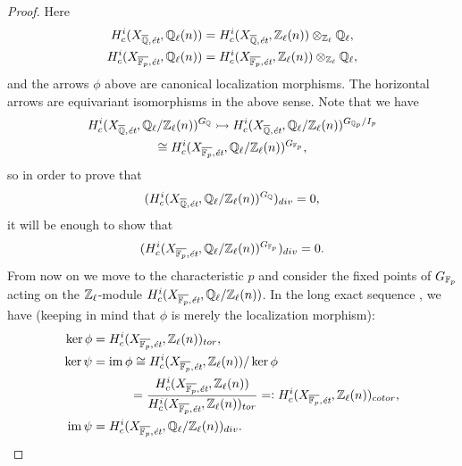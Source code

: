 \begin{proposition}
\begin{proof}
    Here
    \begin{align*}
      H_c^i (X_{\overline{\mathbb{Q}},\text{\it ét}}, \mathbb{Q}_\ell (n)) & = H_c^i (X_{\overline{\mathbb{Q}},\text{\it ét}}, \mathbb{Z}_\ell (n))\otimes_{\mathbb{Z}_\ell} \mathbb{Q}_\ell,\\
      H_c^i (X_{\overline{\mathbb{F}_p},\text{\it ét}}, \mathbb{Q}_\ell (n)) & = H_c^i (X_{\overline{\mathbb{F}_p},\text{\it ét}}, \mathbb{Z}_\ell (n))\otimes_{\mathbb{Z}_\ell} \mathbb{Q}_\ell,
    \end{align*}
    and the arrows $\phi$ above are canonical localization morphisms.
    The horizontal arrows are equivariant isomorphisms in the above sense.
    Note that we have
    \begin{multline*}
      H^i_c (X_{\overline{\mathbb{Q}}, \text{\it ét}}, \mathbb{Q}_\ell/\mathbb{Z}_\ell (n))^{G_{\mathbb{Q}}} \rightarrowtail
      H^i_c (X_{\overline{\mathbb{Q}}, \text{\it ét}}, \mathbb{Q}_\ell/\mathbb{Z}_\ell (n))^{G_{\mathbb{Q}_p}/I_p} \\
      \cong H^i_c (X_{\overline{\mathbb{F}_p}, \text{\it ét}}, \mathbb{Q}_\ell/\mathbb{Z}_\ell (n))^{G_{\mathbb{F}_p}},
    \end{multline*}
    so in order to prove that
    $$(H^i_c (X_{\overline{\mathbb{Q}},\text{\it ét}}, \mathbb{Q}_\ell/\mathbb{Z}_\ell (n))^{G_{\mathbb{Q}}})_{div} = 0,$$
    it will be enough to show that
    $$(H^i_c (X_{\overline{\mathbb{F}_p},\text{\it ét}}, \mathbb{Q}_\ell/\mathbb{Z}_\ell (n))^{G_{\mathbb{F}_p}})_{div} = 0.$$
    From now on we move to the characteristic $p$ and consider the fixed points
    of $G_{\mathbb{F}_p}$ acting on the $\mathbb{Z}_\ell$-module
    $H^i_c (X_{\overline{\mathbb{F}_p},\text{\it ét}}, \mathbb{Q}_\ell/\mathbb{Z}_\ell (n))$. In the
    long exact sequence , we have (keeping in mind
    that $\phi$ is merely the localization morphism):
    \begin{align*}
      \ker \phi & = H^i_c (X_{\overline{\mathbb{F}_p},\text{\it ét}}, \mathbb{Z}_\ell (n))_{tor},\\
      \ker \psi & = \operatorname{im} \phi \cong H^i_c (X_{\overline{\mathbb{F}_p},\text{\it ét}}, \mathbb{Z}_\ell (n)) / \ker \phi \\
                & \quad\quad\quad = \frac{H^i_c (X_{\overline{\mathbb{F}_p},\text{\it ét}}, \mathbb{Z}_\ell (n))}{H^i_c (X_{\overline{\mathbb{F}_p},\text{\it ét}}, \mathbb{Z}_\ell (n))_{tor}} =\mathrel{\mathop:} H^i_c (X_{\overline{\mathbb{F}_p},\text{\it ét}}, \mathbb{Z}_\ell (n))_{cotor},\\
      \operatorname{im} \psi & = H_c^i (X_{\overline{\mathbb{F}_p},\text{\it ét}}, \mathbb{Q}_\ell/\mathbb{Z}_\ell (n))_{div}.
    \end{align*}


\end{proof}
\end{proposition}
